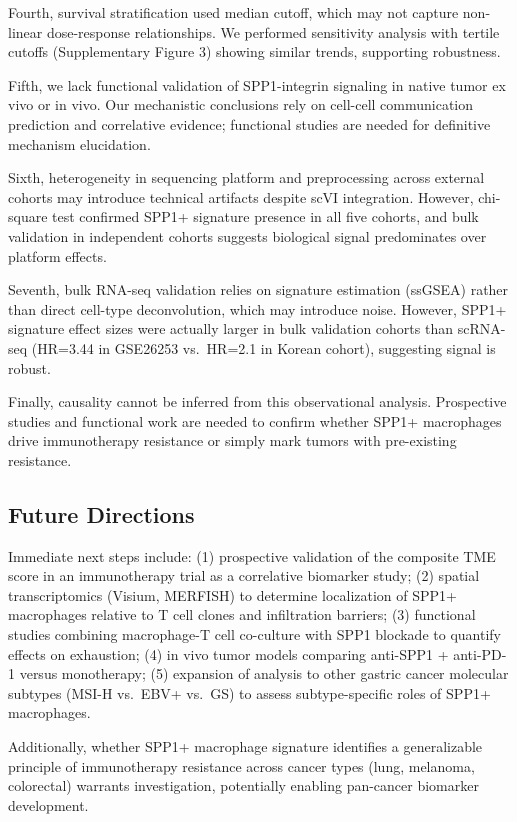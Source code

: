 \documentclass[12pt,twoside]{article}
\begin{document}
Fourth, survival stratification used median cutoff, which may not capture non-linear dose-response relationships. We performed sensitivity analysis with tertile cutoffs (Supplementary Figure 3) showing similar trends, supporting robustness.

Fifth, we lack functional validation of SPP1-integrin signaling in native tumor ex vivo or in vivo. Our mechanistic conclusions rely on cell-cell communication prediction and correlative evidence; functional studies are needed for definitive mechanism elucidation.

Sixth, heterogeneity in sequencing platform and preprocessing across external cohorts may introduce technical artifacts despite scVI integration. However, chi-square test confirmed SPP1+ signature presence in all five cohorts, and bulk validation in independent cohorts suggests biological signal predominates over platform effects.

Seventh, bulk RNA-seq validation relies on signature estimation (ssGSEA) rather than direct cell-type deconvolution, which may introduce noise. However, SPP1+ signature effect sizes were actually larger in bulk validation cohorts than scRNA-seq (HR=3.44 in GSE26253 vs.\ HR=2.1 in Korean cohort), suggesting signal is robust.

Finally, causality cannot be inferred from this observational analysis. Prospective studies and functional work are needed to confirm whether SPP1+ macrophages drive immunotherapy resistance or simply mark tumors with pre-existing resistance.

\subsection{Future Directions}

Immediate next steps include: (1) prospective validation of the composite TME score in an immunotherapy trial as a correlative biomarker study; (2) spatial transcriptomics (Visium, MERFISH) to determine localization of SPP1+ macrophages relative to T cell clones and infiltration barriers; (3) functional studies combining macrophage-T cell co-culture with SPP1 blockade to quantify effects on exhaustion; (4) in vivo tumor models comparing anti-SPP1 + anti-PD-1 versus monotherapy; (5) expansion of analysis to other gastric cancer molecular subtypes (MSI-H vs.\ EBV+ vs.\ GS) to assess subtype-specific roles of SPP1+ macrophages.

Additionally, whether SPP1+ macrophage signature identifies a generalizable principle of immunotherapy resistance across cancer types (lung, melanoma, colorectal) warrants investigation, potentially enabling pan-cancer biomarker development.
\end{document}
